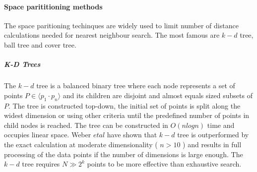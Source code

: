 \paragraph*{Space parititioning methods} 

The space paritioning techinques are widely used to limit number of distance
calculations needed for nearest neighbour search. The most famous are $ k-d $
tree, ball tree and cover tree.

\subparagraph*{K-D Trees}
 
The $ k-d $ tree \cite{(Friedman et al., 1977} is a balanced binary tree where each node
represents a set of points $ P\in\langle p_1 \cdot p_n \rangle $ and its
children are disjoint and almost equals sized subsets of $ P $. The tree is constructed
top-down, the initial set of points is split along the widest dimension or using
other criteria until the predefined number of points in child nodes is reached.
The tree can be constructed in $ O(n log n)$ time and occupies linear space.
Weber $ et al $\cite{Weber:1998:QAP:645924.671192} have shown that  $ k-d $
tree is outperformed by the exact calculation at moderate dimensionality (
$ n > 10 $ ) and results in full processing of the data points if the number of
dimensions is large enough.
The $ k-d $ tree requires $ N \gg 2^k $ points to be more effective than exhaustive
search.

